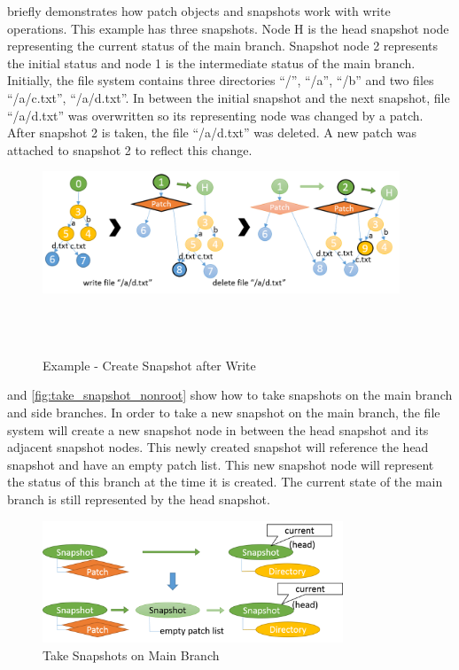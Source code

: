 	 briefly demonstrates how patch objects and snapshots work with write operations. This example has three snapshots. Node H is the head snapshot node representing the current status of the main branch. Snapshot node 2 represents the initial status and node 1 is the intermediate status of the main branch. Initially, the file system contains three directories ``/'', ``/a'', ``/b'' and two files ``/a/c.txt'', ``/a/d.txt''. In between the initial snapshot and the next snapshot, file ``/a/d.txt'' was overwritten so its representing node was changed by a patch. After snapshot 2 is taken, the file ``/a/d.txt'' was deleted. A new patch was attached to snapshot 2 to reflect this change.

\begin{figure}[t]
\centering
\includegraphics[width=0.95\textwidth]{Chapter-4/figs/fig26.png}
\caption{Example - Create Snapshot after Write}
~\\
~\\
\label{fig:create_snapshots}
\end{figure}

     and \ref{fig:take_snapshot_nonroot} show how to take snapshots on the main branch and side branches. In order to take a new snapshot on the main branch, the file system will create a new snapshot node in between the head snapshot and its adjacent snapshot nodes. This newly created snapshot will reference the head snapshot and have an empty patch list. This new snapshot node will represent the status of this branch at the time it is created. The current state of the main branch is still represented by the head snapshot.

\begin{figure}[t]
\centering
\includegraphics[width=0.8\textwidth]{Chapter-4/figs/fig20.png}
\caption{Take Snapshots on Main Branch}
\label{fig:take_snapshot_root}
\end{figure}
    
